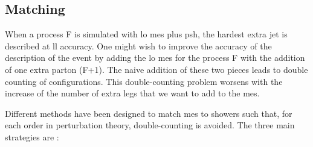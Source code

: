\subsection{Matching}

When a process F is simulated with \gls{lo} \glspl{me} plus \gls{psh}, 
the hardest extra jet is described at \gls{ll} accuracy. 
One might wish to improve the accuracy of the description of the event by adding the \gls{lo} \glspl{me} 
for the process F with the addition of one extra parton (F+1). 
The naive addition of these two pieces leads to double counting of configurations. 
This double-counting problem worsens with the increase of the number of extra legs that we want to add to the \glspl{me}.

Different methods have been designed to match \glspl{me} to showers such that, for each order in perturbation theory, double-counting is avoided. The three main strategies are \cite{Giele:2011cb}:
